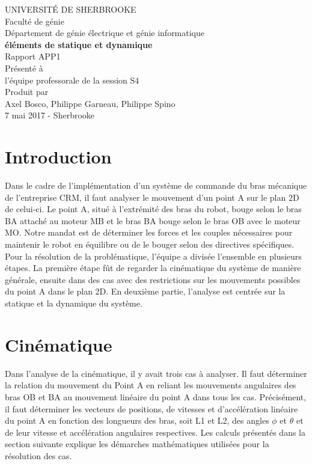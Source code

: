 \documentclass{article}
\begin{document}
\begin{titlepage}   
	\large{
		\begin{center}
			UNIVERSITÉ DE SHERBROOKE\\Faculté de génie\\
			Département de génie électrique et génie informatique\\
			\vspace{3cm}
			{\LARGE\textbf{éléments de statique et dynamique}}\\
			\vspace{2cm}
			\LARGE{Rapport APP1}\\
			\vspace{2cm}
			Présenté à\\l'équipe professorale de la session S4\\
			\vspace{2cm}
			Produit par\\Axel Bosco, Philippe Garneau, Philippe Spino\\
			\vspace{1cm}
			\vfill{7 mai 2017 - Sherbrooke}
		\end{center}
	}
\end{titlepage}
\newpage
\tableofcontents

\newpage
\section{Introduction}
Dans le cadre de l'implémentation d'un système de commande du bras mécanique de l'entreprise CRM, il faut analyser le mouvement d'un point A sur le plan 2D de celui-ci. Le point A, situé à l'extrémité des bras du robot, bouge selon le bras BA attaché au moteur MB et le bras BA bouge selon le bras OB avec le moteur MO. Notre mandat est de déterminer les forces et les couples nécessaires pour maintenir le robot en équilibre ou de le bouger selon des directives spécifiques. Pour la résolution de la problématique, l'équipe a divisée l'ensemble en plusieurs étapes. La première étape fût de regarder la cinématique du système de manière générale, ensuite dans des cas avec des restrictions sur les mouvements possibles du point A dans le plan 2D. En deuxième partie, l'analyse est centrée sur la statique et la dynamique du système. 

\section{Cinématique}
Dans l'analyse de la cinématique, il y avait trois cas à analyser. Il faut déterminer la relation du mouvement du Point A en reliant les mouvements angulaires des bras OB et BA au mouvement linéaire du point A dans tous les cas. Précisément, il faut déterminer les vecteurs de positions, de vitesses et d'accélération linéaire du point A en fonction des longueurs des bras, soit L1 et L2, des angles $\phi$ et $\theta$ et de leur vitesse et accélération angulaires respectives. Les calculs présentés dans la section suivante explique les démarches mathématiques utilisées pour la résolution des cas.
\end{document}
